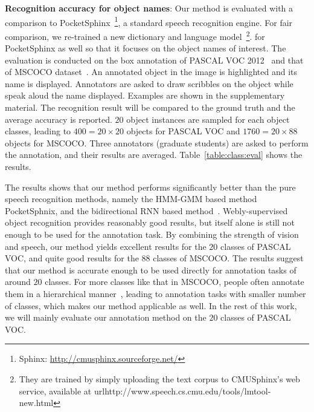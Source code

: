 \textbf{Recognition accuracy for object names}: Our method is
evaluated with a comparison to PocketSphinx~\footnote{Sphinx: \url{http://cmusphinx.sourceforge.net/}}, a standard
speech recognition engine. For fair comparison, we re-trained a new
dictionary and language model~\footnote{They are trained by simply
  uploading the text corpus to CMUSphinx's web
  service, available at url{http://www.speech.cs.cmu.edu/tools/lmtool-new.html}}.  for PocketSphinx as well so that
it focuses on the object names of interest.  The evaluation is
conducted on the box annotation of PASCAL VOC 2012~\citep{pascal:2011}
and that of MSCOCO dataset~\citep{coco:eccv}.  An annotated object in
the image is highlighted and its name is displayed. Annotators are
asked to draw scribbles on the object while speak aloud the name
displayed.  Examples are shown in the supplementary material.  The
recognition result will be compared to the ground truth and the
average accuracy is reported. $20$ object instances are sampled for
each object classes, leading to $400=20\times 20$ objects for PASCAL
VOC and $1760=20\times 88$ objects for MSCOCO. Three annotators
(graduate students) are asked to perform the annotation, and their
results are averaged. Table~\ref{table:class:eval} shows the results.

The results shows that our method performs significantly better than
the pure speech recognition methods, namely the HMM-GMM based method
PocketSphnix, and the bidirectional RNN based
method~\citep{end-to-end:speech,lexfree2015}. Webly-supervised object
recognition provides reasonably good results, but itself alone is
still not enough to be used for the annotation task. By combining the
strength of vision and speech, our method yields excellent results for
the $20$ classes of PASCAL VOC, and quite good results for the $88$
classes of MSCOCO. The results suggest that our method is accurate
enough to be used directly for annotation tasks of around $20$
classes. For more classes like that in MSCOCO, people often annotate
them in a hierarchical manner~\citep{coco:eccv}, leading to annotation
tasks with smaller number of classes, which makes our method
applicable as well.  In the rest of this work, we will mainly evaluate
our annotation method on the $20$ classes of PASCAL VOC.

